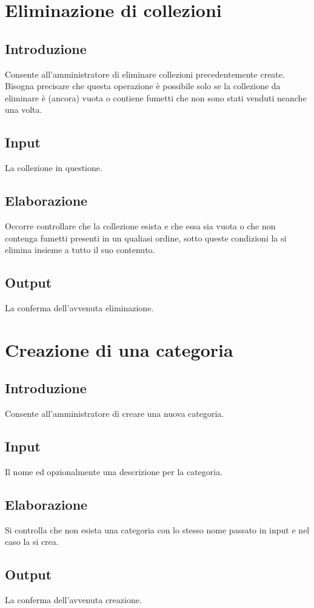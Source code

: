 \documentclass{scrreprt}
\begin{document}
\section{Eliminazione di collezioni}

\subsection*{Introduzione}
Consente all'amministratore di eliminare collezioni precedentemente create. Bisogna precisare che questa operazione
è possibile solo se la collezione da eliminare è (ancora) vuota o contiene fumetti che non sono stati venduti neanche
una volta.
\subsection*{Input}
La collezione in questione.
\subsection*{Elaborazione}
Occorre controllare che la collezione esista e che essa sia vuota o che non contenga fumetti presenti in un qualiasi
ordine, sotto queste condizioni la si elimina insieme a tutto il suo contenuto.
\subsection*{Output}
La conferma dell'avvenuta eliminazione.

\section{Creazione di una categoria}

\subsection*{Introduzione}
Consente all'amministratore di creare una nuova categoria.
\subsection*{Input}
Il nome ed opzionalmente una descrizione per la categoria.
\subsection*{Elaborazione}
Si controlla che non esista una categoria con lo stesso nome passato in input e nel caso la si crea.
\subsection*{Output}
La conferma dell'avvenuta creazione.
\end{document}
